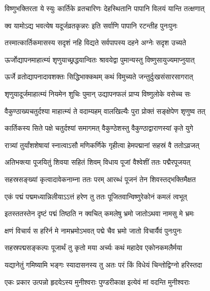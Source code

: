\twolineshloka
{विष्णुभक्तिरता ये स्युः कार्तिके व्रतचारिणः}
{देहस्थितानि पापानि विलयं यान्ति तत्क्षणात्} %

\twolineshloka
{क्व यामोऽद्य भवत्येष यदूर्जव्रतकृन्नरः}
{इति सर्वाणि पापानि रटन्तीह पुनःपुनः} %

\twolineshloka
{तस्मात्कार्तिकमासस्य सदृशं नहि विद्यते}
{सर्वपापस्य दहने अग्नेः सदृश उच्यते} %

\twolineshloka
{ऊर्जोद्यापनमाहात्म्यं शृणुयाच्छ्रद्धयान्वितः}
{श्रावयेद्वा पुमान्यस्तु विष्णुसायुज्यमाप्नुयात्} %


\twolineshloka
{ऊर्जे व्रतोद्यापनादावशक्तः सिद्धिभाक्कथम्}
{कथं विमुच्यते जन्तुर्दुःखसंसारसागरात्} %


\twolineshloka
{शृणुयादूर्जमाहात्म्यं नियमेन शुचिः पुमान्}
{उद्यापनफलं प्राप्य विष्णुलोके वसेच्च सः} %





\twolineshloka
{वैकुण्ठाख्यचतुर्दश्या माहात्म्यं ते वदाम्यहम्}
{वालखिल्यैः पुरा प्रोक्तं सङ्क्षेपेण शृणुष्व तत्} %


\twolineshloka
{कार्तिकस्य सिते पक्षे चतुर्दश्यां समागमत्}
{वैकुण्ठेशस्तु वैकुण्ठाद्वाराणस्यां कृते युगे} %

\twolineshloka
{रात्र्यां तुर्यांशशेषायां स्नात्वाऽसौ मणिकर्णिके}
{गृहीत्वा हेमपद्मानां सहस्रं वै ततोऽव्रजत्} %

\twolineshloka
{अतिभक्त्या पूजयितुं शिवया सहितं शिवम्}
{विधाय पूजां वैश्वेशीं ततः पद्मैरपूजयत्} %

\twolineshloka
{सहस्रसङ्ख्यां कृत्वादावेकनाम्ना ततः परम्}
{आरब्धं पूजनं तेन शिवस्तद्भक्तिमैक्षत} %

\twolineshloka
{एकं पद्मं पद्ममध्यान्निलीयाऽऽत्तं हरेण तु}
{ततः पूजितवान्विष्णुरेकोनं कमलं त्वभूत्} %

\twolineshloka
{इतस्ततस्तेन दृष्टं पद्मं तिष्ठति न क्वचित्}
{कमलेषु भ्रमो जातोऽथवा नामसु मे भ्रमः} %

\twolineshloka
{क्षणं विचार्य स हरिर्न मे नामभ्रमोऽभवत्}
{पद्मे चैव भ्रमो जातो विचार्यैवं पुनःपुनः} %

\twolineshloka
{सहस्रपद्मसङ्कल्पः पूजार्थं तु कृतो मया}
{अर्च्यः कथं महादेव एकोनकमलैर्मया} %

\twolineshloka
{यद्यानेतुं गमिष्यामि भङ्गः स्यादासनस्य तु}
{अतः परं किं विधेयं चिन्तोद्विग्नो हरिस्तदा} %

\twolineshloka
{एकः प्रकार उत्पन्नो हृदयेऽस्य मुनीश्वराः}
{पुण्डरीकाक्ष इत्येवं मां वदन्ति मुनीश्वराः} %

